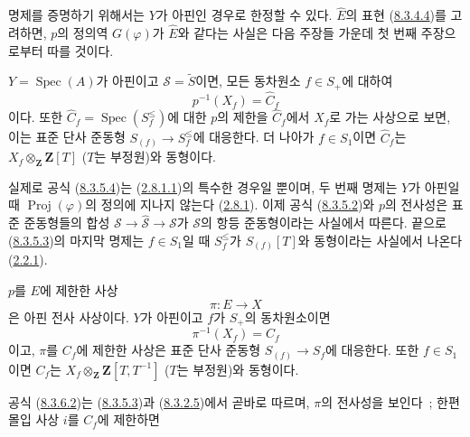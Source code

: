 명제를 증명하기 위해서는 $Y$가 아핀인 경우로 한정할 수 있다.
$\widehat{E}$의 표현 (\hyperref[II.8.3.4.4-ko]{8.3.4.4})를 고려하면,
$p$의 정의역 $G(\varphi)$가 $\widehat{E}$와 같다는 사실은 다음 주장들
가운데 첫 번째 주장으로부터 따를 것이다.

\begin{env}[8.3.5.3]
\label{II.8.3.5.3-ko}
$Y=\operatorname{Spec}(A)$가 아핀이고 $\mathcal{S}=\widetilde{S}$이면,
모든 동차원소 $f\in S_+$에 대하여
\begin{equation}
\label{II.8.3.5.4-ko}
  p^{-1}(X_f)=\widehat{C}_f
\tag{8.3.5.4}
\end{equation}
이다. 또한 $\widehat{C}_f=\operatorname{Spec}(S_f^{\leq})$에 대한
$p$의 제한을 $\widehat{C}_f$에서 $X_f$로 가는 사상으로 보면, 이는
표준 단사 준동형 $S_{(f)}\to S_f^{\leq}$에 대응한다. 더 나아가
$f\in S_1$이면 $\widehat{C}_f$는
$X_f\otimes_{\mathbf{Z}}\mathbf{Z}[T]$ ($T$는 부정원)와 동형이다.
\end{env}

실제로 공식 (\hyperref[II.8.3.5.4-ko]{8.3.5.4})는
(\hyperref[II.2.8.1.1-ko]{2.8.1.1})의 특수한 경우일 뿐이며, 두 번째
명제는 $Y$가 아핀일 때 $\operatorname{Proj}(\varphi)$의 정의에
지나지 않는다 (\hyperref[II.2.8.1-ko]{2.8.1}). 이제 공식
(\hyperref[II.8.3.5.2-ko]{8.3.5.2})와 $p$의 전사성은 표준 준동형들의
합성 $\mathcal{S}\to\widehat{\mathcal{S}}\to\mathcal{S}$가
$\mathcal{S}$의 항등 준동형이라는 사실에서 따른다. 끝으로
(\hyperref[II.8.3.5.3-ko]{8.3.5.3})의 마지막 명제는 $f\in S_1$일 때
$S_f^{\leq}$가 $S_{(f)}[T]$와 동형이라는 사실에서 나온다
(\hyperref[II.2.2.1-ko]{2.2.1}).

\begin{corollary}[8.3.6]
\label{II.8.3.6-ko}
$p$를 $E$에 제한한 사상
\begin{equation}
\label{II.8.3.6.1-ko}
  \pi:E\to X
\tag{8.3.6.1}
\end{equation}
은 아핀 전사 사상이다. $Y$가 아핀이고 $f$가 $S_+$의 동차원소이면
\begin{equation}
\label{II.8.3.6.2-ko}
  \pi^{-1}(X_f)=C_f
\tag{8.3.6.2}
\end{equation}
이고, $\pi$를 $C_f$에 제한한 사상은 표준 단사 준동형
$S_{(f)}\to S_f$에 대응한다. 또한 $f\in S_1$이면 $C_f$는
$X_f\otimes_{\mathbf{Z}}\mathbf{Z}[T,T^{-1}]$ ($T$는 부정원)와
동형이다.
\end{corollary}

공식 (\hyperref[II.8.3.6.2-ko]{8.3.6.2})는
(\hyperref[II.8.3.5.3-ko]{8.3.5.3})과
(\hyperref[II.8.3.2.5-ko]{8.3.2.5})에서 곧바로 따르며, $\pi$의
전사성을 보인다~; 한편 몰입 사상 $i$를 $C_f$에 제한하면

